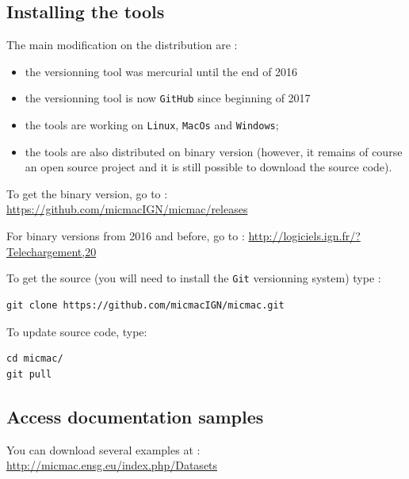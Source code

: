 \subsection{Installing the tools}
\label{Install}

The main modification on the distribution are :

\begin{itemize}
   \item the  versionning tool was mercurial until the end of 2016
   \item  the versionning tool is now {\tt GitHub} since beginning of 2017
   \item  the tools are working on {\tt Linux}, {\tt MacOs} and  {\tt Windows};
   \item  the tools are also distributed on binary version (however, it remains of course an open source project and it is still possible to download the source code).
\end{itemize}

\vspace{0.5cm}
To get the binary version, go to : \url{https://github.com/micmacIGN/micmac/releases}

\vspace{0.5cm}
For binary versions from 2016 and before, go to : \url{http://logiciels.ign.fr/?Telechargement,20}

\vspace{0.5cm}
To get the source (you will need to install the {\tt Git} versionning system) type :

\begin{verbatim}
git clone https://github.com/micmacIGN/micmac.git
\end{verbatim}

To update source code, type:

\begin{verbatim}
cd micmac/ 
git pull
\end{verbatim}


\subsection{Access documentation samples}

You can download several examples at : \url{http://micmac.ensg.eu/index.php/Datasets}


